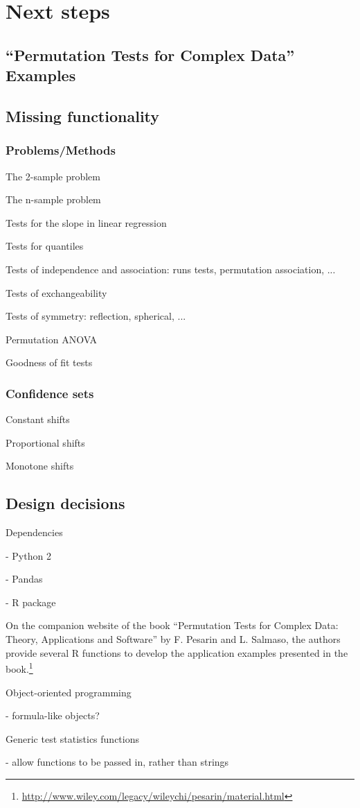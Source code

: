 \chapter{Next steps}

\section{``Permutation Tests for Complex Data'' Examples}

\cite{pesarin2010permutation}

\section{Missing functionality}


\subsection{Problems/Methods}

The 2-sample problem

The n-sample problem

Tests for the slope in linear regression 

Tests for quantiles

Tests of independence and association: runs tests, permutation association, ...

Tests of exchangeability

Tests of symmetry: reflection, spherical, ...

Permutation ANOVA

Goodness of fit tests


\subsection{Confidence sets}

Constant shifts

Proportional shifts

Monotone shifts

\section{Design decisions}

Dependencies

- Python 2

- Pandas


- R package

On the companion website of the book ``Permutation Tests for Complex Data:
Theory, Applications and Software'' by F. Pesarin and L. Salmaso, the
authors provide several R functions to develop the application examples
presented in the book.\footnote{\url{http://www.wiley.com/legacy/wileychi/pesarin/material.html}}

Object-oriented programming

- formula-like objects?

Generic test statistics functions

- allow functions to be passed in, rather than strings
